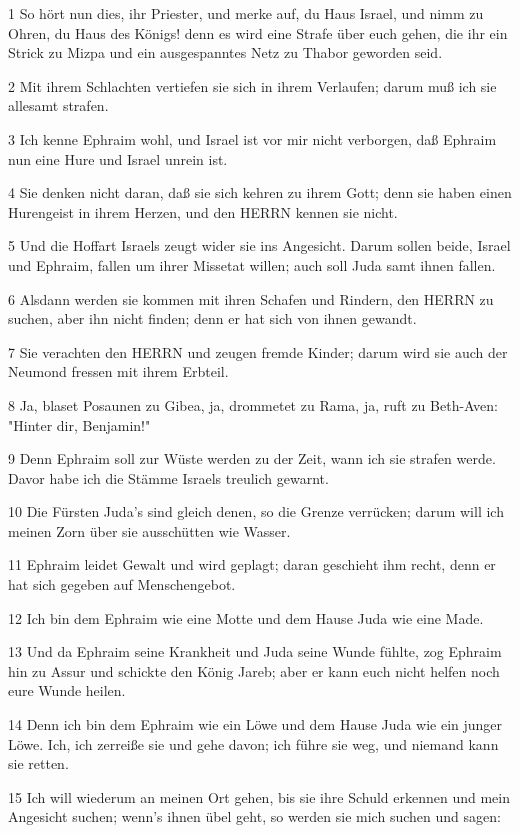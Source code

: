 \par 1 So hört nun dies, ihr Priester, und merke auf, du Haus Israel, und nimm zu Ohren, du Haus des Königs! denn es wird eine Strafe über euch gehen, die ihr ein Strick zu Mizpa und ein ausgespanntes Netz zu Thabor geworden seid.
\par 2 Mit ihrem Schlachten vertiefen sie sich in ihrem Verlaufen; darum muß ich sie allesamt strafen.
\par 3 Ich kenne Ephraim wohl, und Israel ist vor mir nicht verborgen, daß Ephraim nun eine Hure und Israel unrein ist.
\par 4 Sie denken nicht daran, daß sie sich kehren zu ihrem Gott; denn sie haben einen Hurengeist in ihrem Herzen, und den HERRN kennen sie nicht.
\par 5 Und die Hoffart Israels zeugt wider sie ins Angesicht. Darum sollen beide, Israel und Ephraim, fallen um ihrer Missetat willen; auch soll Juda samt ihnen fallen.
\par 6 Alsdann werden sie kommen mit ihren Schafen und Rindern, den HERRN zu suchen, aber ihn nicht finden; denn er hat sich von ihnen gewandt.
\par 7 Sie verachten den HERRN und zeugen fremde Kinder; darum wird sie auch der Neumond fressen mit ihrem Erbteil.
\par 8 Ja, blaset Posaunen zu Gibea, ja, drommetet zu Rama, ja, ruft zu Beth-Aven: "Hinter dir, Benjamin!"
\par 9 Denn Ephraim soll zur Wüste werden zu der Zeit, wann ich sie strafen werde. Davor habe ich die Stämme Israels treulich gewarnt.
\par 10 Die Fürsten Juda's sind gleich denen, so die Grenze verrücken; darum will ich meinen Zorn über sie ausschütten wie Wasser.
\par 11 Ephraim leidet Gewalt und wird geplagt; daran geschieht ihm recht, denn er hat sich gegeben auf Menschengebot.
\par 12 Ich bin dem Ephraim wie eine Motte und dem Hause Juda wie eine Made.
\par 13 Und da Ephraim seine Krankheit und Juda seine Wunde fühlte, zog Ephraim hin zu Assur und schickte den König Jareb; aber er kann euch nicht helfen noch eure Wunde heilen.
\par 14 Denn ich bin dem Ephraim wie ein Löwe und dem Hause Juda wie ein junger Löwe. Ich, ich zerreiße sie und gehe davon; ich führe sie weg, und niemand kann sie retten.
\par 15 Ich will wiederum an meinen Ort gehen, bis sie ihre Schuld erkennen und mein Angesicht suchen; wenn's ihnen übel geht, so werden sie mich suchen und sagen:

